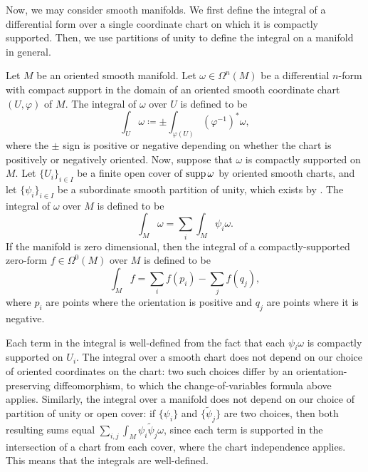 \documentclass[a4paper,12pt]{article}
\begin{document}
Now, we may consider smooth manifolds.
We first define the integral of a differential form over a single coordinate chart on which it is compactly supported.
Then, we use partitions of unity to define the integral on a manifold in general.
\begin{definition}\label{def:integral_of_differential_form}
    Let $M$ be an oriented smooth manifold.
    Let $\omega \in \Omega^n(M)$ be a differential $n$-form with compact support in the domain of an oriented smooth coordinate chart $(U, \varphi)$ of $M$.
    The integral of $\omega$ over $U$ is defined to be
    \begin{equation}
        \int_U \omega \coloneq \pm \int_{\varphi(U)} (\varphi^{-1})^* \omega,
    \end{equation}
    where the $\pm$ sign is positive or negative depending on whether the chart is positively or negatively oriented.
    Now, suppose that $\omega$ is compactly supported on $M$.
    Let $\{U_i\}_{i \in I}$ be a finite open cover of $\operatorname{supp} \omega$ by oriented smooth charts, and let $\{\psi_i\}_{i \in I}$ be a subordinate smooth partition of unity, which exists by \cite[Thm.~2.23]{Lee2012}.
    The integral of $\omega$ over $M$ is defined to be
    \begin{equation}
        \int_M \omega = \sum_i \int_M \psi_i \omega.
    \end{equation}
    If the manifold is zero dimensional, then the integral of a compactly-supported zero-form $f \in \Omega^0(M)$ over $M$ is defined to be
    \begin{equation}
        \int_M f = \sum_i f(p_i) - \sum_j f(q_j),
    \end{equation}
    where $p_i$ are points where the orientation is positive and $q_j$ are points where it is negative.
\end{definition}
Each term in the integral is well-defined from the fact that each $\psi_i \omega$ is compactly supported on $U_i$.
The integral over a smooth chart does not depend on our choice of oriented coordinates on the chart: two such choices differ by an orientation-preserving diffeomorphism, to which the change-of-variables formula above applies.
Similarly, the integral over a manifold does not depend on our choice of partition of unity or open cover: if $\{\psi_i\}$ and $\{\tilde{\psi}_j\}$ are two choices, then both resulting sums equal $\sum_{i, j} \int_M \psi_i \tilde{\psi}_j \omega$, since each term is supported in the intersection of a chart from each cover, where the chart independence applies.
This means that the integrals are well-defined.
\end{document}
